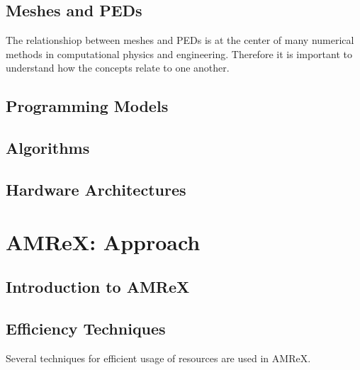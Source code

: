 \documentclass[12pt, a4paper]{article}
\begin{document}
\subsection{Meshes and PEDs}

The relationshiop between meshes and PEDs is at the center of many numerical methods 
in computational physics and engineering. Therefore it is important to understand how 
the concepts relate to one another. 

\subsection{Programming Models}
\subsection{Algorithms}



\subsection{Hardware Architectures}

\section{AMReX: Approach}
\subsection{Introduction to AMReX}



\subsection{Efficiency Techniques}

Several techniques for efficient usage of resources are used in AMReX.
\end{document}

